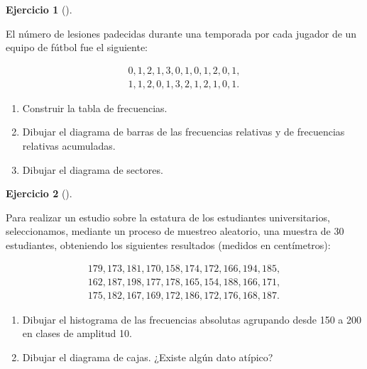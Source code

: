 \documentclass[
  spanish,
  a4paper,
]{scrreport}
\theoremstyle{definition}
\newtheorem{exercise}{Ejercicio}[chapter]
\theoremstyle{remark}
\begin{document}
\begin{exercise}[]\protect\hypertarget{exr-frecuencias-graficos-lesiones}{}\label{exr-frecuencias-graficos-lesiones}

El número de lesiones padecidas durante una temporada por cada jugador
de un equipo de fútbol fue el siguiente:

\[
\begin{array}{c}
0, 1, 2, 1, 3, 0, 1, 0, 1, 2, 0, 1, \\
1, 1, 2, 0, 1, 3, 2, 1, 2, 1, 0, 1.
\end{array}
\]

\begin{enumerate}
\def\labelenumi{\alph{enumi}.}
\item
  Construir la tabla de frecuencias.
\item
  Dibujar el diagrama de barras de las frecuencias relativas y de
  frecuencias relativas acumuladas.
\item
  Dibujar el diagrama de sectores.
\end{enumerate}

\end{exercise}

\begin{exercise}[]\protect\hypertarget{exr-frecuencias-graficos-estaturas}{}\label{exr-frecuencias-graficos-estaturas}

Para realizar un estudio sobre la estatura de los estudiantes
universitarios, seleccionamos, mediante un proceso de muestreo
aleatorio, una muestra de 30 estudiantes, obteniendo los siguientes
resultados (medidos en centímetros):

\[
\begin{array}{c}
179, 173, 181, 170, 158, 174, 172, 166, 194, 185,\\
162, 187, 198, 177, 178, 165, 154, 188, 166, 171,\\
175, 182, 167, 169, 172, 186, 172, 176, 168, 187.
\end{array}
\]

\begin{enumerate}
\def\labelenumi{\alph{enumi}.}
\item
  Dibujar el histograma de las frecuencias absolutas agrupando desde 150
  a 200 en clases de amplitud 10.
\item
  Dibujar el diagrama de cajas. ¿Existe algún dato atípico?
\end{enumerate}

\end{exercise}
\end{document}
